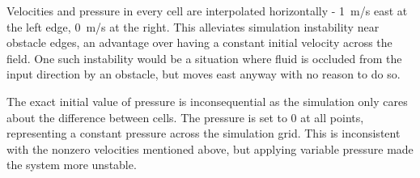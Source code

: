 Velocities and pressure in every cell are interpolated horizontally - \SI{1}{m/s} east at the left edge, \SI{0}{m/s} at the right.
This alleviates simulation instability near obstacle edges, an advantage over having a constant initial velocity across the field.
One such instability would be a situation where fluid is occluded from the input direction by an obstacle, but moves east anyway with no reason to do so.

The exact initial value of pressure is inconsequential as the simulation only cares about the difference between cells.
The pressure is set to 0 at all points, representing a constant pressure across the simulation grid.
This is inconsistent with the nonzero velocities mentioned above, but applying variable pressure made the system more unstable.